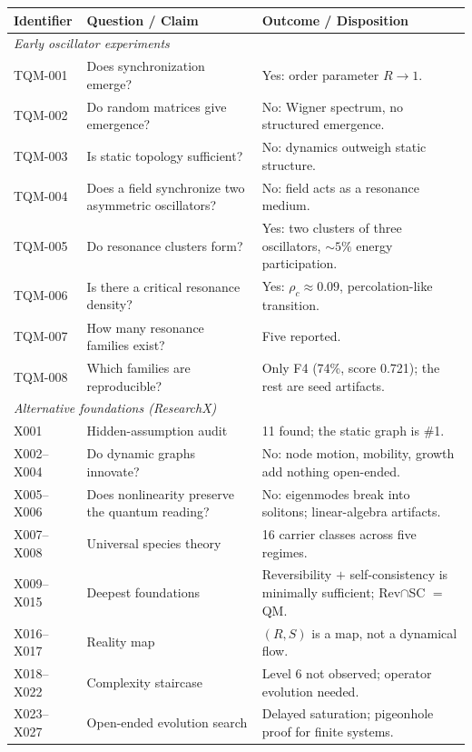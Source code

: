 \documentclass[10pt,twoside,openany]{book}
\begin{document}
\begin{longtable}{p{4.2cm}p{5.2cm}p{5.6cm}}
\toprule
Identifier & Question / Claim & Outcome / Disposition \\
\midrule
\endhead
\multicolumn{3}{l}{\emph{Early oscillator experiments}} \\
\midrule
TQM-001 & Does synchronization emerge? & Yes: order parameter $R\to1$. \\
TQM-002 & Do random matrices give emergence? & No: Wigner spectrum, no structured emergence. \\
TQM-003 & Is static topology sufficient? & No: dynamics outweigh static structure. \\
TQM-004 & Does a field synchronize two asymmetric oscillators? & No: field acts as a resonance medium. \\
TQM-005 & Do resonance clusters form? & Yes: two clusters of three oscillators, $\sim5\%$ energy participation. \\
TQM-006 & Is there a critical resonance density? & Yes: $\rho_c\approx0.09$, percolation-like transition. \\
TQM-007 & How many resonance families exist? & Five reported. \\
TQM-008 & Which families are reproducible? & Only F4 (74\%, score 0.721); the rest are seed artifacts. \\
\midrule
\multicolumn{3}{l}{\emph{Alternative foundations (ResearchX)}} \\
\midrule
X001 & Hidden-assumption audit & 11 found; the static graph is \#1. \\
X002--X004 & Do dynamic graphs innovate? & No: node motion, mobility, growth add nothing open-ended. \\
X005--X006 & Does nonlinearity preserve the quantum reading? & No: eigenmodes break into solitons; linear-algebra artifacts. \\
X007--X008 & Universal species theory & 16 carrier classes across five regimes. \\
X009--X015 & Deepest foundations & Reversibility $+$ self-consistency is minimally sufficient; Rev$\cap$SC $=$ QM. \\
X016--X017 & Reality map & $(R,S)$ is a map, not a dynamical flow. \\
X018--X022 & Complexity staircase & Level 6 not observed; operator evolution needed. \\
X023--X027 & Open-ended evolution search & Delayed saturation; pigeonhole proof for finite systems. \\

\end{longtable}
\end{document}
